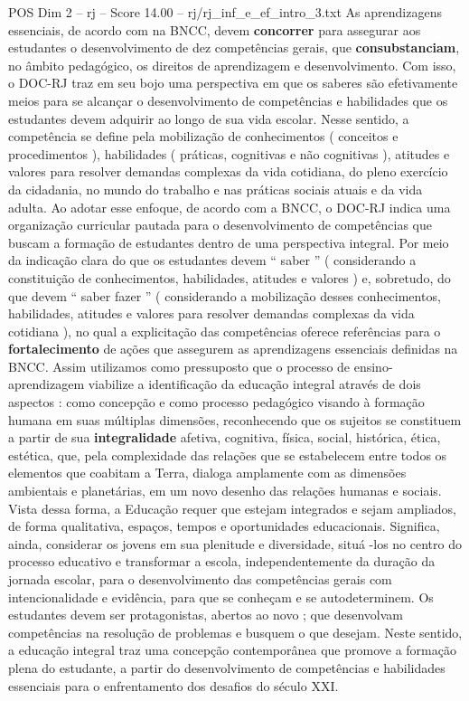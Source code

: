 \begin{textsample}{POS Dim 2 – rj – Score 14.00 – rj/rj\_inf\_e\_ef\_intro\_3.txt}
As aprendizagens essenciais, de acordo com na BNCC, devem \textbf{concorrer} para assegurar aos estudantes o desenvolvimento de dez competências gerais, que \textbf{consubstanciam}, no âmbito pedagógico, os direitos de aprendizagem e desenvolvimento.
Com isso, o DOC-RJ traz em seu bojo uma perspectiva em que os saberes são efetivamente meios para se alcançar o desenvolvimento de competências e habilidades que os estudantes devem adquirir ao longo de sua vida escolar.
Nesse sentido, a competência se define pela mobilização de conhecimentos ( conceitos e procedimentos ), habilidades ( práticas, cognitivas e não cognitivas ), atitudes e valores para resolver demandas complexas da vida cotidiana, do pleno exercício da cidadania, no mundo do trabalho e nas práticas sociais atuais e da vida adulta.
Ao adotar esse enfoque, de acordo com a BNCC, o DOC-RJ indica uma organização curricular pautada para o desenvolvimento de competências que buscam a formação de estudantes dentro de uma perspectiva integral.
Por meio da indicação clara do que os estudantes devem “ saber ” ( considerando a constituição de conhecimentos, habilidades, atitudes e valores ) e, sobretudo, do que devem “ saber fazer ” ( considerando a mobilização desses conhecimentos, habilidades, atitudes e valores para resolver demandas complexas da vida cotidiana ), no qual a explicitação das competências oferece referências para o \textbf{fortalecimento} de ações que assegurem as aprendizagens essenciais definidas na BNCC.
Assim utilizamos como pressuposto que o processo de ensino-aprendizagem viabilize a identificação da educação integral através de dois aspectos : como concepção e como processo pedagógico visando à formação humana em suas múltiplas dimensões, reconhecendo que os sujeitos se constituem a partir de sua \textbf{integralidade} afetiva, cognitiva, física, social, histórica, ética, estética, que, pela complexidade das relações que se estabelecem entre todos os elementos que coabitam a Terra, dialoga amplamente com as dimensões ambientais e planetárias, em um novo desenho das relações humanas e sociais.
Vista dessa forma, a Educação requer que estejam integrados e sejam ampliados, de forma qualitativa, espaços, tempos e oportunidades educacionais.
Significa, ainda, considerar os jovens em sua plenitude e diversidade, situá -los no centro do processo educativo e transformar a escola, independentemente da duração da jornada escolar, para o desenvolvimento das competências gerais com intencionalidade e evidência, para que se conheçam e se autodeterminem.
Os estudantes devem ser protagonistas, abertos ao novo ; que desenvolvam competências na resolução de problemas e busquem o que desejam.
Neste sentido, a educação integral traz uma concepção contemporânea que promove a formação plena do estudante, a partir do desenvolvimento de competências e habilidades essenciais para o enfrentamento dos desafios do século XXI.

\end{textsample}
